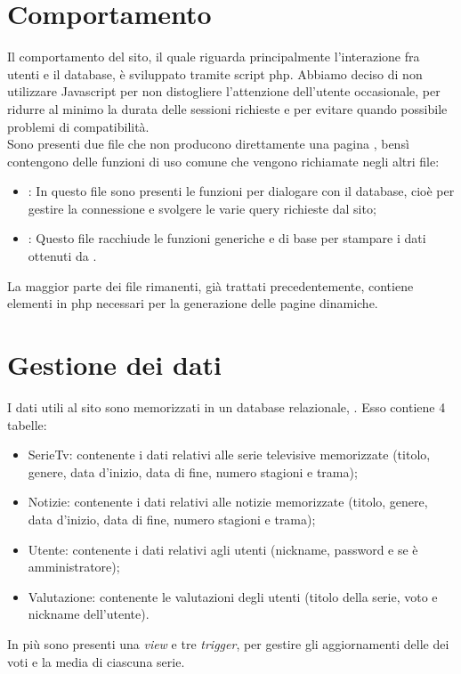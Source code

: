 \documentclass{tecweb}
\begin{document}
	\section{Comportamento}
	Il comportamento del sito, il quale riguarda principalmente l'interazione fra utenti e il database, è sviluppato tramite script php. Abbiamo deciso di non utilizzare Javascript per non distogliere l'attenzione dell'utente occasionale, per ridurre al minimo la durata delle sessioni richieste e per evitare quando possibile problemi di compatibilità.\\
	Sono presenti due file che non producono direttamente una pagina , bensì contengono delle funzioni di uso comune che vengono richiamate negli altri file:
	\begin{itemize}
		\item {}: In questo file sono presenti le funzioni per dialogare con il database, cioè per gestire la connessione e svolgere le varie query richieste dal sito;
		\item {}: Questo file racchiude le funzioni generiche e di base per stampare i dati ottenuti da .
	\end{itemize}
	La maggior parte dei file rimanenti, già trattati precedentemente, contiene elementi in php necessari per la generazione delle pagine  dinamiche.
	\newpage
	\section{Gestione dei dati}
	I dati utili al sito sono memorizzati in un database relazionale, . Esso contiene 4 tabelle:
	\begin{itemize}
		\item SerieTv: contenente i dati relativi alle serie televisive memorizzate (titolo, genere, data d'inizio, data di fine, numero stagioni e trama);
		\item Notizie: contenente i dati relativi alle notizie  memorizzate (titolo, genere, data d'inizio, data di fine, numero stagioni e trama);
		\item Utente: contenente i dati relativi agli utenti (nickname, password e se è amministratore);
		\item Valutazione: contenente le valutazioni degli utenti (titolo della serie, voto e nickname dell'utente).
	\end{itemize}
	In più sono presenti una \textit{view} e tre \textit{trigger}, per gestire gli aggiornamenti delle dei voti e la media di ciascuna serie.
	
\end{document}
